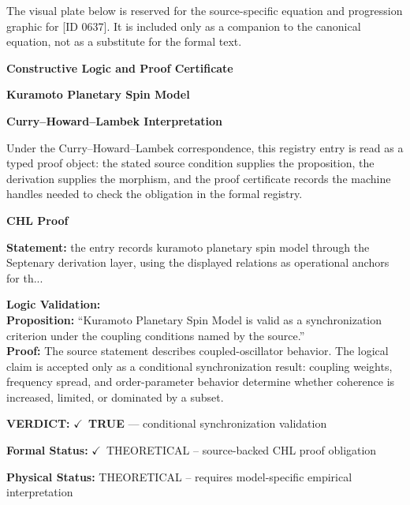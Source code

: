 \begingroup\footnotesize\sloppy
The visual plate below is reserved for the source-specific equation and progression graphic for [ID 0637]. It is included only as a companion to the canonical equation, not as a substitute for the formal text.
\par\endgroup
\ifTZPDarkEdition
{}
\fi

\clearpage
\begingroup\tzpsupportsetup
\noindent\textbf{\fontsize{10.8pt}{12.8pt}\selectfont [ID 0637] Constructive Logic and Proof Certificate}\par
\noindent\textbf{\fontsize{10pt}{12pt}\selectfont Kuramoto Planetary Spin Model}\par
\vspace{0.45em}
\begingroup
\footnotesize
\setlength{\parskip}{0.22em}
\setlength{\parindent}{0pt}
\noindent\textbf{Curry--Howard--Lambek Interpretation}\par
Under the Curry--Howard--Lambek correspondence, this registry entry is read as a typed proof
object: the stated source condition supplies the proposition, the derivation supplies the
morphism, and the proof certificate records the machine handles needed to check the obligation
in the formal registry.

\vspace{0.45em}
\noindent\textbf{CHL Proof}\par
\textbf{Statement:} the entry records kuramoto planetary spin model through the Septenary derivation layer,
using the displayed relations as operational anchors for th...

\textbf{Logic Validation:}\\
\textbf{Proposition:} ``Kuramoto Planetary Spin Model is valid as a synchronization criterion under the coupling
conditions named by the source.''\\
\textbf{Proof:} The source statement describes coupled-oscillator behavior. The logical claim is
accepted only as a conditional synchronization result: coupling weights, frequency
spread, and order-parameter behavior determine whether coherence is increased, limited,
or dominated by a subset.

\textbf{VERDICT:} \ensuremath{\checkmark}\ \textbf{TRUE} --- conditional synchronization validation

\textbf{Formal Status:} \ensuremath{\checkmark}\ THEORETICAL -- source-backed CHL proof obligation

\textbf{Physical Status:} THEORETICAL -- requires model-specific empirical interpretation
\par\vspace{0.45em}
\par
\ifTZPDarkEdition
{}
\fi
\endgroup
\endgroup
